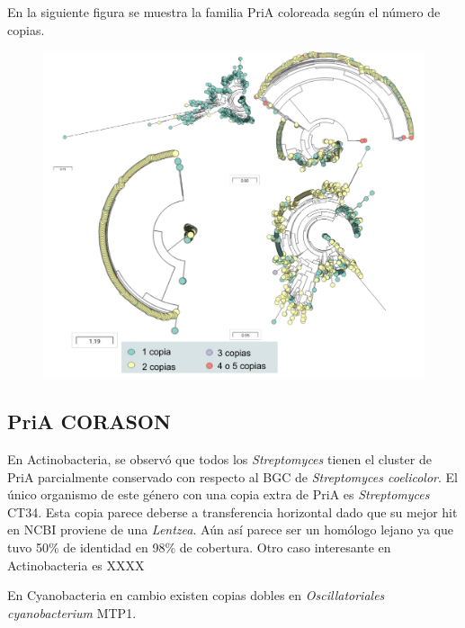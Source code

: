 \documentclass[12pt,twoside]{reedthesis}
\begin{document}
  En la siguiente figura se muestra la familia PriA coloreada según el
  número de copias.
  
  \begin{figure}[h!tbp]
  \centering
  \includegraphics[angle = 0,scale = 0.8]{chapter4/PriAEvoMiningCopies.pdf}
  \caption[Copias extras de PriA en Actinobacteria, Cyanobacteria, Pseudomonas y Archaea]{\footnotesize{}}
  \label{fig:PriAEvoMiningCopies}
  \end{figure}
  
  \subsection{PriA CORASON}\label{pria-corason}
  
  En Actinobacteria, se observó que todos los \emph{Streptomyces} tienen
  el cluster de PriA parcialmente conservado con respecto al BGC de
  \emph{Streptomyces coelicolor}. El único organismo de este género con
  una copia extra de PriA es \emph{Streptomyces} CT34. Esta copia parece
  deberse a transferencia horizontal dado que su mejor hit en NCBI
  proviene de una \emph{Lentzea}. Aún así parece ser un homólogo lejano ya
  que tuvo 50\% de identidad en 98\% de cobertura. Otro caso interesante
  en Actinobacteria es XXXX
  
  En Cyanobacteria en cambio existen copias dobles en
  \emph{Oscillatoriales cyanobacterium} MTP1.
  
\end{document}
